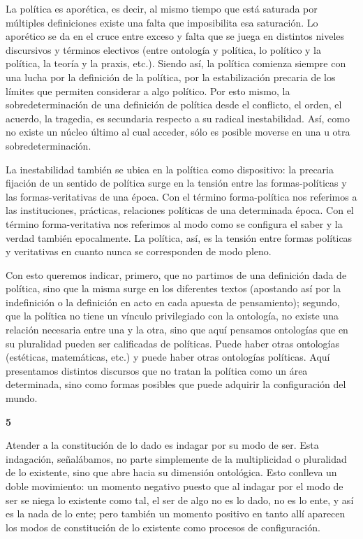 La política es aporética, es decir, al mismo tiempo que está saturada por múltiples definiciones existe una falta que imposibilita esa saturación. Lo aporético se da en el cruce entre exceso y falta que se juega en distintos niveles discursivos y términos electivos (entre ontología y política, lo político y la política, la teoría y la praxis, etc.). Siendo así, la política comienza siempre con una lucha por la definición de la política, por la estabilización precaria de los límites que permiten considerar a algo político. Por esto mismo, la sobredeterminación de una definición de política desde el conflicto, el orden, el acuerdo, la tragedia, es secundaria respecto a su radical inestabilidad. Así, como no existe un núcleo último al cual acceder, sólo es posible moverse en una u otra sobredeterminación.

La inestabilidad también se ubica en la política como dispositivo: la precaria fijación de un sentido de política surge en la tensión entre las formas-políticas y las formas-veritativas de una época. Con el término forma-política nos referimos a las instituciones, prácticas, relaciones políticas de una determinada época. Con el término forma-veritativa nos referimos al modo como se configura el saber y la verdad también epocalmente. La política, así, es la tensión entre formas políticas y veritativas en cuanto nunca se corresponden de modo pleno.

Con esto queremos indicar, primero, que no partimos de una definición dada de política, sino que la misma surge en los diferentes textos (apostando así por la indefinición o la definición en acto en cada apuesta de pensamiento); segundo, que la política no tiene un vínculo privilegiado con la ontología, no existe una relación necesaria entre una y la otra, sino que aquí pensamos ontologías que en su pluralidad pueden ser calificadas de políticas. Puede haber otras ontologías (estéticas, matemáticas, etc.) y puede haber otras ontologías políticas. Aquí presentamos distintos discursos que no tratan la política como un área determinada, sino como formas posibles que puede adquirir la configuración del mundo.

\vspace{1em}
\noindent\textbf{5}

Atender a la constitución de lo dado es indagar por su modo de ser. Esta indagación, señalábamos, no parte simplemente de la multiplicidad o pluralidad de lo existente, sino que abre hacia su dimensión ontológica. Esto conlleva un doble movimiento: un momento negativo puesto que al indagar por el modo de ser se niega lo existente como tal, el ser de algo no es lo dado, no es lo ente, y así es la nada de lo ente; pero también un momento positivo en tanto allí aparecen los modos de constitución de lo existente como procesos de configuración.

